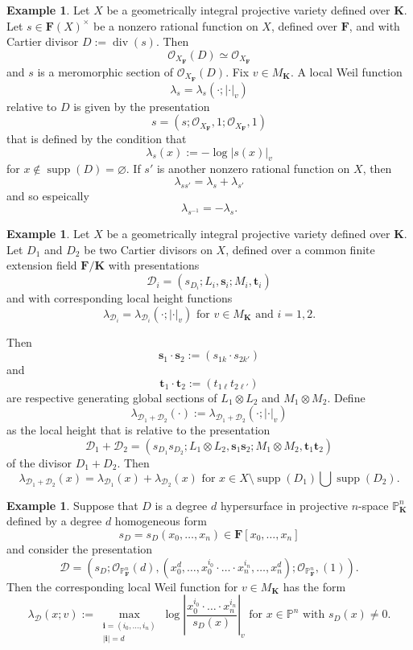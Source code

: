 \documentclass[10pt]{amsart}
\newcommand{\Osh}{{\mathcal O}}                        %
\renewcommand{\emptyset}{\varnothing}
\newcommand{\KK}{\mathbf{K}}
\newcommand{\FF}{\mathbf{F}}
\newcommand{\PP}{\mathbb{P}} %
\theoremstyle{definition}
\newtheorem{example}[theorem]{Example}
\numberwithin{equation}{section}
\begin{document}
\begin{example} Let $X$ be a geometrically integral projective variety defined over $\KK$.
Let $s \in \FF(X)^\times$ be a nonzero rational function on $X$, defined over $\FF$, and with Cartier divisor $D := \operatorname{div}(s)$.  Then 
$$
\Osh_{X_{\FF}}(D) \simeq \Osh_{X_{\FF}}
$$
and $s$ is a meromorphic section of $\Osh_{X_{\FF}}(D)$.  Fix $v \in M_{\KK}$.  A local Weil function
$$\lambda_s = \lambda_s(\cdot; |\cdot|_v)$$ relative to $D$ is given by the presentation
$$
s = (s;\Osh_{X_{\FF}},1;\Osh_{X_{\FF}},1)
$$
that is defined by the condition that
$$
\lambda_s(x) := - \log |s(x)|_v
$$
for $x \not \in \operatorname{supp}(D) = \emptyset$.
If $s'$ is another nonzero rational function on $X$, then 
$$
\lambda_{ss'} = \lambda_{s} + \lambda_{s'}
$$
and so espeically
$$
\lambda_{s^{-1}} = - \lambda_s \text{.}
$$
\end{example}

\begin{example} Let $X$ be a geometrically integral projective variety defined over $\KK$.
Let $D_1$ and $D_2$ be two Cartier divisors on $X$, defined over a common finite extension field $\FF / \KK$ with presentations 
$$
\mathcal{D}_i = (s_{D_i};L_i,\mathbf{s}_i; M_i, \mathbf{t}_i)
$$
and with corresponding local height functions 
$$\lambda_{\mathcal{D}_i} = \lambda_{\mathcal{D}_i}(\cdot; |\cdot|_v)
\text{ for $v \in M_{\KK}$ and $i = 1,2$.}
$$

Then 
$$\mathbf{s}_1\cdot \mathbf{s}_2 := ( s_{1k} \cdot s_{2 k'})$$ 
and 
$$\mathbf{t}_1 \cdot \mathbf{t}_2 := (t_{1\ell} t_{2 \ell'})$$ 
are respective generating global sections of $L_1 \otimes L_2$ and $M_1 \otimes M_2$.  Define 
$$\lambda_{\mathcal{D}_1 + \mathcal{D}_2} (\cdot) := \lambda_{\mathcal{D}_1 + \mathcal{D}_2}(\cdot; |\cdot|_v)
$$ 
as the local height that is relative to the presentation
$$
\mathcal{D}_1 + \mathcal{D}_2 = (s_{D_1} s_{D_2}; L_1 \otimes L_2, \mathbf{s}_1 \mathbf{s}_2; M_1 \otimes M_2, \mathbf{t}_1 \mathbf{t}_2)
$$
of the divisor $D_1 + D_2$.  Then
$$
\lambda_{\mathcal{D}_1 + \mathcal{D}_2}(x) = \lambda_{\mathcal{D}_1}(x) + \lambda_{\mathcal{D}_2}(x) \text{ for $x \in X \setminus \operatorname{supp}(D_1) \bigcup \operatorname{supp}(D_2)$.}
$$
\end{example}

\begin{example}
Suppose that $D$ is a degree $d$ hypersurface in projective $n$-space $\PP^n_{\KK}$ defined by a degree $d$ homogeneous form
$$
s_D = s_D (x_0,\dots,x_n) \in \FF[x_0,\dots,x_n] 
$$
and consider the presentation
$$
\mathcal{D} = (s_D; \Osh_{\PP^n_{\FF}}(d), (x_0^d,\dots, x_0^{i_0} \cdot \hdots \cdot x_n^{i_n}, \dots, x_n^d); \Osh_{\PP^n_{\FF}}, (1)) \text{.}
$$
Then the corresponding local Weil function for $v \in M_{\KK}$ has the form
$$
\lambda_{\mathcal{D}}(x; v) := \max_{
\substack{
\mathbf{i} = (i_0,\dots,i_n) \\
|\mathbf{i}| = d
}
}
 \log \left| \frac{x_0^{i_0} \cdot \hdots \cdot x_n^{i_n}}{s_D(x)} \right|_v
\text{ 
for $x \in \PP^n$ with $s_D(x) \not = 0$.
}
$$
\end{example}
\end{document}
